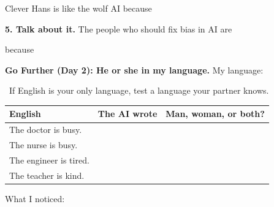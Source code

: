 \documentclass[11pt]{article}
\begin{document}
\vspace{0.7em}
Clever Hans is like the wolf AI because 

\vspace{1.0em}
{\large\textbf{5. Talk about it.}} The people who should fix bias in AI are 

\vspace{0.6em}
because \ansline{6.3in}{}

\vspace{1.2em}
{\large\textbf{Go Further (Day 2): He or she in my language.}} My language: 

\vspace{0.3em}
\ELL\ If English is your only language, test a language your partner knows.

\vspace{0.3em}
\begin{tabular}{|R{2.4in}|R{2.3in}|c|}
\hline
\textbf{English} & \textbf{The AI wrote} & \textbf{Man, woman, or both?} \\ \hline
The doctor is busy. & & \\[0.4em] \hline
The nurse is busy. & & \\[0.4em] \hline
The engineer is tired. & & \\[0.4em] \hline
The teacher is kind. & & \\[0.4em] \hline
\end{tabular}

\vspace{0.6em}
What I noticed: 

\vspace{1.0em}
\end{document}
